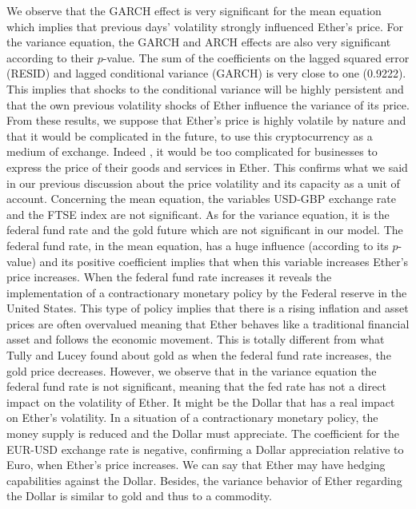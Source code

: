 \documentclass[11pt]{report}
\begin{document}
We observe that the GARCH effect is very significant for the mean equation which implies that previous days’ volatility strongly influenced Ether’s price. For the variance equation, the GARCH and ARCH effects are also very significant according to their $p$-value. The sum of the coefficients on the lagged squared error (RESID) and lagged conditional variance (GARCH) is very close to one (0.9222). This implies that shocks to the conditional variance will be highly persistent and that the own previous volatility shocks of Ether influence the variance of its price. From these results, we suppose that Ether’s price is highly volatile by nature and that it would be complicated in the future, to use this cryptocurrency as a medium of exchange. Indeed , it would be too complicated for businesses to express the price of their goods and services in Ether. This confirms what we said in our previous discussion about the price volatility and its capacity as a unit of account. \newline
Concerning the mean equation, the variables USD-GBP exchange rate and the FTSE index are not significant. As for the variance equation, it is the federal fund rate and the gold future which are not significant in our model.\newline
The federal fund rate, in the mean equation, has a huge influence (according to its $p$-value) and its positive coefficient implies that when this variable increases  Ether’s price increases. When the federal fund rate increases it reveals the implementation of a contractionary monetary policy by the Federal reserve in the United States. This type of policy implies that there is a rising inflation and asset prices are often overvalued meaning that Ether behaves like a traditional financial asset and follows the economic movement. This is totally different from what Tully and Lucey found about gold as when the federal fund rate increases, the gold price decreases. However, we observe that in the variance equation the federal fund rate is not significant, meaning that the fed rate has not a direct impact on the volatility of Ether. It might be the Dollar that has a real impact on Ether’s volatility. In a situation of a contractionary monetary policy, the money supply is reduced and the Dollar must appreciate. The coefficient for the EUR-USD exchange rate is negative, confirming a Dollar appreciation relative to Euro, when Ether’s price increases. We can say that Ether may have hedging capabilities against the Dollar. Besides, the variance behavior of Ether regarding the Dollar is similar to gold and thus to a commodity.\newline 
\end{document}
